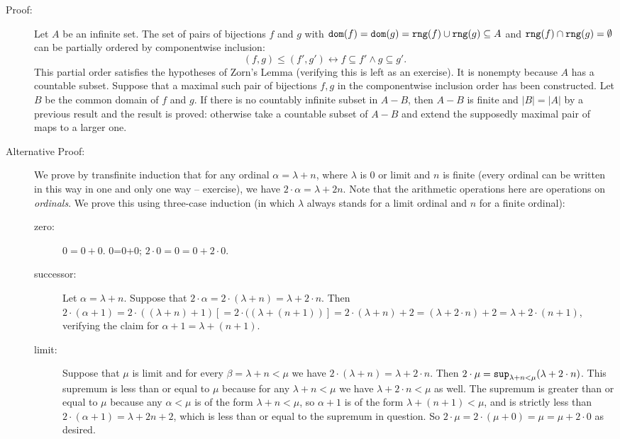 \documentclass[12pt]{book}
\begin{document}
\begin{description}
\item[Proof:] Let $A$ be an infinite set.  The set of
pairs of bijections $f$ and $g$ with ${\tt dom}(f)={\tt dom}(g) = {\tt rng}(f) \cup {\tt rng}(g) \subseteq A$ and
${\tt rng}(f) \cap {\tt rng}(g) = \emptyset$ can be partially ordered by componentwise
inclusion: $$(f,g) \leq (f',g') \leftrightarrow f\subseteq f' \wedge g \subseteq g'.$$  This partial order satisfies the hypotheses of Zorn's Lemma (verifying this is left as an exercise).  It is nonempty
because $A$ has a countable subset. Suppose that a maximal such pair
of bijections $f,g$ in the componentwise inclusion order has been constructed. Let $B$ be the common domain of $f$ and $g$. If there is no countably infinite
subset in $A-B$, then $A-B$ is finite and $|B|=|A|$ by a previous
result and the result is proved: otherwise take a countable
subset of $A-B$ and extend the supposedly maximal pair of  maps to a larger one.

\item[Alternative Proof:]  We prove by transfinite induction that for any ordinal $\alpha = \lambda+n$, where $\lambda$ is 0 or limit and $n$ is finite (every ordinal can be written in this way in one and only one way -- exercise), we have $2 \cdot\alpha = \lambda+2n$.  Note that the arithmetic operations here are operations on {\em ordinals\/}.  We prove this using three-case induction (in which $\lambda$ always stands for a limit ordinal and $n$ for a finite ordinal):

\begin{description}

\item[zero:]   $0=0+0$.  0=0+0;  $2 \cdot 0 = 0 = 0+2\cdot 0$.

\item[successor:]  Let $\alpha=\lambda +n$.  Suppose that $2\cdot\alpha=2 \cdot(\lambda+n) = \lambda+2\cdot n$.  Then $2\cdot (\alpha+1)=2 \cdot ((\lambda+n)+1) [= 2 \cdot ((\lambda+(n+1))] = 2\cdot(\lambda +n) +2 = (\lambda + 2\cdot n)+2 = \lambda+2\cdot (n+1)$, verifying the claim for $\alpha+1=\lambda+(n+1)$.

\item[limit:]  Suppose that $\mu$ is limit and for every $\beta=\lambda+n<\mu$ we have $2\cdot(\lambda+n) = \lambda+2\cdot n$.  Then $2 \cdot \mu = {\tt sup}_{\lambda+n <\mu}(\lambda+2\cdot n)$.   This supremum is less than or equal to $\mu$ because for any $\lambda+n <\mu$ we have $\lambda+2\cdot n<\mu$ as well.  The supremum is greater than or equal to $\mu$ because any $\alpha<\mu$ is of the form $\lambda+n<\mu$, so $\alpha+1$ is of the form $\lambda+(n+1)<\mu$, and is strictly less than $2 \cdot (\alpha+1)=
\lambda+2n+2$, which is less than or equal to the supremum in question.  So $2\cdot \mu = 2 \cdot (\mu + 0) = \mu = \mu+2\cdot 0$ as desired.


\end{description}
\end{description}
\end{document}
